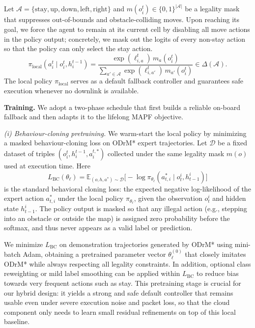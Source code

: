 \documentclass[conference]{IEEEtran}
\begin{document}
Let $\mathcal A=\{\text{stay},\text{up},\text{down},\text{left},\text{right}\}$
and $m(o_i^t)\in\{0,1\}^{|\mathcal A|}$ be a legality mask that suppresses
out-of-bounds and obstacle-colliding moves.
Upon reaching its goal, we force the agent to remain at its current cell by disabling all move actions in the policy output; concretely, we mask out the logits of every non-stay action so that the policy can only select the stay action.
\begin{equation}
\pi_{\text{local}}(a_i^t \mid o_i^t, h_i^{t-1})
=\frac{\exp(\ell_{i,a}^t)\,m_a(o_i^t)}
       {\sum_{a'\in\mathcal A}\exp(\ell_{i,a'}^t)\,m_{a'}(o_i^t)}
\in \Delta(\mathcal A).
\end{equation}
The local policy $\pi_{\text{local}}$ serves as a default fallback controller
and guarantees safe execution whenever no downlink is available.


\textbf{Training.}
We adopt a two-phase schedule that first builds a reliable on-board fallback
and then adapts it to the lifelong MAPF objective.

\textit{(i) Behaviour-cloning pretraining.}
We warm-start the local policy by minimizing a masked behaviour-cloning loss
on ODrM* expert trajectories. Let $\mathcal D$ be a fixed dataset of triples
$(o_i^t,h_i^{t-1},a_i^{t,*})$ collected under the same legality mask $m(o)$
used at execution time. Here
\[
L_{\mathrm{BC}}(\theta_\ell)
= \mathbb{E}_{(o,h,a^\ast)\sim \mathcal{D}}
\big[-\log \pi_{\theta_\ell}(a_{t,i}^\ast \mid o_t^i, h_{t-1}^i)\big]
\tag{4}
\]
is the standard behavioral cloning loss: the expected negative log-likelihood of the expert action $a_{t,i}^\ast$ under the local policy $\pi_{\theta_\ell}$, given the observation $o_t^i$ and hidden state $h_{t-1}^i$. The policy output is masked so that any illegal action (e.g., stepping into an obstacle or outside the map) is assigned zero probability before the softmax, and thus never appears as a valid label or prediction.

We minimize $L_{\mathrm{BC}}$ on demonstration trajectories generated by ODrM* using mini-batch Adam, obtaining a pretrained parameter vector $\theta_\ell^{(0)}$ that closely imitates ODrM* while always respecting all legality constraints. In addition, optional class reweighting or mild label smoothing can be applied within $L_{\mathrm{BC}}$ to reduce bias towards very frequent actions such as stay. This pretraining stage is crucial for our hybrid design: it yields a strong and safe default controller that remains usable even under severe execution noise and packet loss, so that the cloud component only needs to learn small residual refinements on top of this local baseline.
\end{document}
